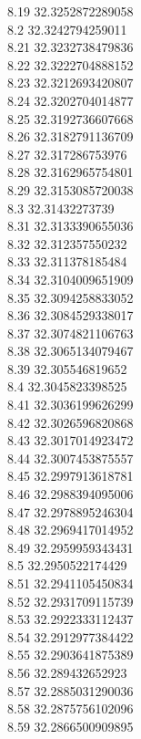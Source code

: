 {8.19	32.3252872289058\\
8.2	32.3242794259011\\
8.21	32.3232738479836\\
8.22	32.3222704888152\\
8.23	32.3212693420807\\
8.24	32.3202704014877\\
8.25	32.3192736607668\\
8.26	32.3182791136709\\
8.27	32.317286753976\\
8.28	32.3162965754801\\
8.29	32.3153085720038\\
8.3	32.31432273739\\
8.31	32.3133390655036\\
8.32	32.312357550232\\
8.33	32.311378185484\\
8.34	32.3104009651909\\
8.35	32.3094258833052\\
8.36	32.3084529338017\\
8.37	32.3074821106763\\
8.38	32.3065134079467\\
8.39	32.305546819652\\
8.4	32.3045823398525\\
8.41	32.3036199626299\\
8.42	32.3026596820868\\
8.43	32.3017014923472\\
8.44	32.3007453875557\\
8.45	32.2997913618781\\
8.46	32.2988394095006\\
8.47	32.2978895246304\\
8.48	32.2969417014952\\
8.49	32.2959959343431\\
8.5	32.2950522174429\\
8.51	32.2941105450834\\
8.52	32.2931709115739\\
8.53	32.2922333112437\\
8.54	32.2912977384422\\
8.55	32.2903641875389\\
8.56	32.289432652923\\
8.57	32.2885031290036\\
8.58	32.2875756102096\\
8.59	32.2866500909895\\
}
